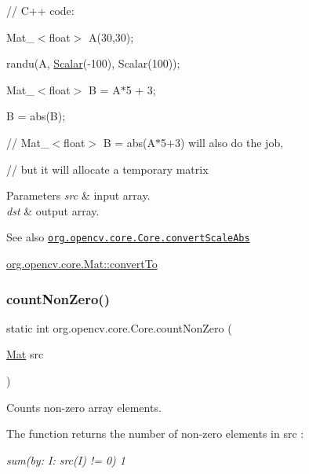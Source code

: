 // C++ code\+:

Mat\+\_\+$<$float$>$ A(30,30);

randu(A, \mbox{\hyperlink{classorg_1_1opencv_1_1core_1_1_scalar}{Scalar}}(-\/100), Scalar(100));

Mat\+\_\+$<$float$>$ B = A$\ast$5 + 3;

B = abs(\+B);

// Mat\+\_\+$<$float$>$ B = abs(A$\ast$5+3) will also do the job,

// but it will allocate a temporary matrix


\begin{DoxyParams}{Parameters}
{\em src} & input array. \\
\hline
{\em dst} & output array.\\
\hline
\end{DoxyParams}
\begin{DoxySeeAlso}{See also}
\href{http://docs.opencv.org/modules/core/doc/operations_on_arrays.html#convertscaleabs}{\tt org.\+opencv.\+core.\+Core.\+convert\+Scale\+Abs} 

\mbox{\hyperlink{classorg_1_1opencv_1_1core_1_1_mat_aa783d679e1b68aa5f9da6434be761eb7}{org.\+opencv.\+core.\+Mat\+::convert\+To}} 
\end{DoxySeeAlso}
\mbox{\label{classorg_1_1opencv_1_1core_1_1_core_a216308f36e765f82c521087fe283e045}} 
\subsubsection{\texorpdfstring{count\+Non\+Zero()}{countNonZero()}}
{\footnotesize\ttfamily static int org.\+opencv.\+core.\+Core.\+count\+Non\+Zero (\begin{DoxyParamCaption}\item[{\mbox{\hyperlink{classorg_1_1opencv_1_1core_1_1_mat}{Mat}}}]{src }\end{DoxyParamCaption})\hspace{0.3cm}{\ttfamily [static]}}

Counts non-\/zero array elements.

The function returns the number of non-\/zero elements in {\ttfamily src} \+:

{\itshape sum(by\+: I\+: src(\+I) != 0) 1}


